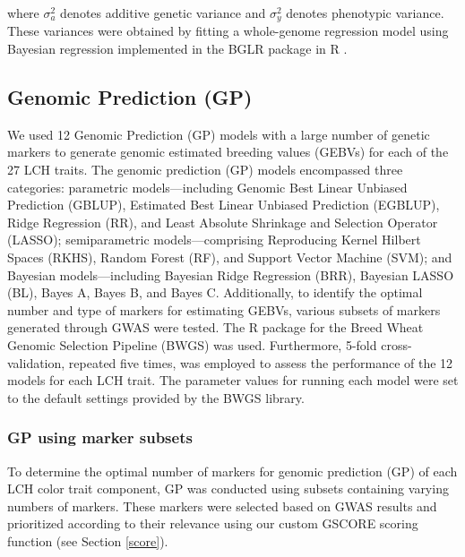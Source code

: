 \documentclass[pdflatex,sn-mathphys-ay]{sn-jnl}%
\begin{document}
where $\sigma_{a}^{2}$ denotes additive genetic variance and $\sigma_{y}^{2}$ denotes phenotypic variance. These variances were obtained by fitting a whole-genome regression model using Bayesian regression implemented in the BGLR package in R \citep{Campos2014}. %


\subsection{Genomic Prediction (GP)}
We used 12 Genomic Prediction (GP) models with a large number of genetic markers to generate genomic estimated breeding values (GEBVs) for each of the 27 LCH traits. 
The genomic prediction (GP) models encompassed three categories: parametric models—including Genomic Best Linear Unbiased Prediction (GBLUP), Estimated Best Linear Unbiased Prediction (EGBLUP), Ridge Regression (RR), and Least Absolute Shrinkage and Selection Operator (LASSO); semiparametric models—comprising Reproducing Kernel Hilbert Spaces (RKHS), Random Forest (RF), and Support Vector Machine (SVM); and Bayesian models—including Bayesian Ridge Regression (BRR), Bayesian LASSO (BL), Bayes A, Bayes B, and Bayes C.
Additionally, to identify the optimal number and type of markers for estimating GEBVs, various subsets of markers generated through GWAS were tested.
The R package for the Breed Wheat Genomic Selection Pipeline (BWGS) \citep{Charmet2020} was used. Furthermore, 5-fold cross-validation, repeated five times, was employed to assess the performance of the 12 models for each LCH trait. The parameter values for running each model were set to the default settings provided by the BWGS library.

\subsubsection{GP using marker subsets}


To determine the optimal number of markers for genomic prediction (GP) of each LCH color trait component, GP was conducted using subsets containing varying numbers of markers. These markers were selected based on GWAS results and prioritized according to their relevance using our custom GSCORE scoring function (see Section \ref{score}). 
\end{document}

